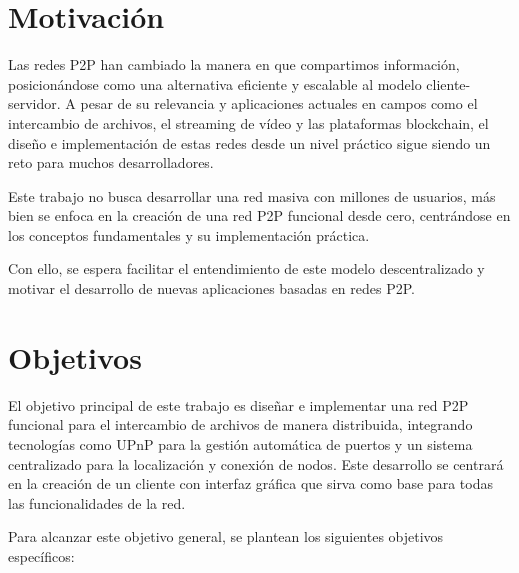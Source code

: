 \section{Motivación}

Las redes P2P han cambiado la manera en que compartimos información,
posicionándose como una alternativa eficiente y escalable al modelo cliente-servidor.
A pesar de su relevancia y aplicaciones actuales en campos como el intercambio de archivos, el streaming de vídeo y las plataformas blockchain,
el diseño e implementación de estas redes desde un nivel práctico sigue siendo un reto para muchos desarrolladores.

Este trabajo no busca desarrollar una red masiva con millones de usuarios, más bien se enfoca en la creación de una red P2P funcional desde cero,
centrándose en los conceptos fundamentales y su implementación práctica.

Con ello, se espera facilitar el entendimiento de este modelo descentralizado y motivar el desarrollo de nuevas aplicaciones basadas en redes P2P.


\section{Objetivos}

El objetivo principal de este trabajo es diseñar e implementar una red P2P funcional para el intercambio de archivos de manera distribuida,
integrando tecnologías como UPnP para la gestión automática de puertos y un sistema centralizado para la localización y conexión de nodos.
Este desarrollo se centrará en la creación de un cliente con interfaz gráfica que sirva como base para todas las funcionalidades de la red.

Para alcanzar este objetivo general, se plantean los siguientes objetivos específicos:

